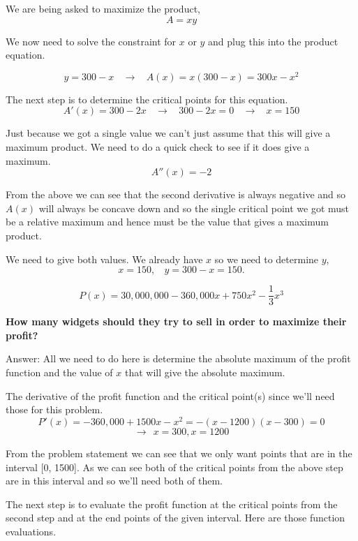 \documentclass{article}
\begin{document}
\begin{description}[style=nextline]
We are being asked to maximize the product,
$$A = xy$$

We now need to solve the constraint for $x$ or $y$ and plug this into the product equation.

$$y = 300 - x \ \ \ \ \rightarrow \ \ \ \ A(x) = x(300 - x) = 300x - x^2$$

The next step is to determine the critical points for this equation.
$$A'(x) = 300 - 2x \ \ \ \ \rightarrow \ \ \ \ 300 - 2x = 0 \ \ \ \ \rightarrow \ \ \ \ x = 150$$

Just because we got a single value we can’t just assume that this will give a maximum product. We need to do a quick check to see if it does give a maximum.
$$A''(x) = -2$$

From the above we can see that the second derivative is always negative and so $A(x)$ will always be concave down and so the single critical point we got must be a relative maximum and hence must be the value that gives a maximum product.

We need to give both values. We already have $x$ so we need to determine $y$,
$$x = 150, \ \ \ \ y = 300 - x = 150.$$

\item[Question 13: A company can produce a maximum of 1500 widgets in a year. If they sell $x$ widgets during the year then their profit, in dollars, is given by,]
$$P(x) = 30,000,000 - 360,000x + 750x^2 - \frac{1}{3}x^3$$

\textbf{How many widgets should they try to sell in order to maximize their profit?}

Answer: All we need to do here is determine the absolute maximum of the profit function and the value of $x$ that will give the absolute maximum.

The derivative of the profit function and the critical point(s) since we'll need those for this problem.
$$P'(x) = -360,000 + 1500x - x^2 = -(x-1200)(x-300) = 0$$
$$\rightarrow \ \ x = 300, x = 1200$$

From the problem statement we can see that we only want points that are in the interval [0, 1500]. As we can see both of the critical points from the above step are in this interval and so we'll need both of them.

The next step is to evaluate the profit function at the critical points from the second step and at the end points of the given interval. Here are those function evaluations.


\end{description}
\end{document}
